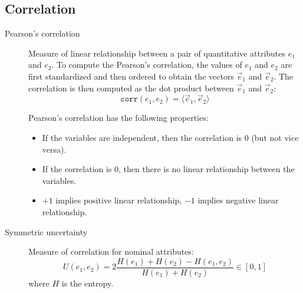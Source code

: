 \subsection{Correlation}

\begin{description}
    \item[Pearson's correlation] 
        Measure of linear relationship between a pair of quantitative attributes $e_1$ and $e_2$.
        To compute the Pearson's correlation, the values of $e_1$ and $e_2$ are first standardized and then ordered to obtain the vectors $\vec{e}_1$ and $\vec{e}_2$.
        The correlation is then computed as the dot product between $\vec{e}_1$ and $\vec{e}_2$:
        \[ \texttt{corr}(e_1, e_2) = \langle \vec{e}_1, \vec{e}_2 \rangle \]

        Pearson's correlation has the following properties:
        \begin{itemize}
            \item If the variables are independent, then the correlation is 0 (but not vice versa).
            \item If the correlation is 0, then there is no linear relationship between the variables.
            \item $+1$ implies positive linear relationship, $-1$ implies negative linear relationship.
        \end{itemize}

    \item[Symmetric uncertainty]
        Measure of correlation for nominal attributes:
        \[ U(e_1, e_2) = 2 \frac{H(e_1) + H(e_2) - H(e_1, e_2)}{H(e_1) + H(e_2)} \in [0, 1] \]
        where $H$ is the entropy.
\end{description}